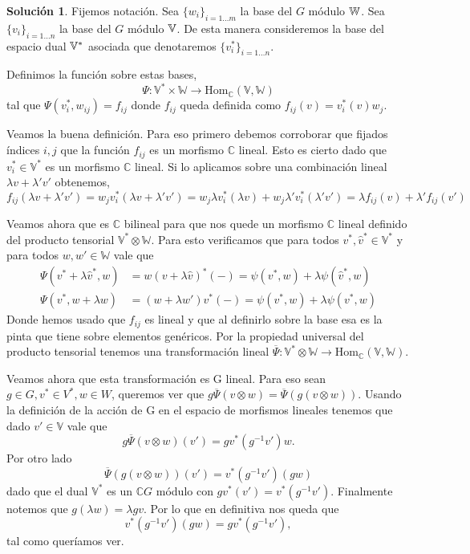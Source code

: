 \documentclass[11pt]{article}
\theoremstyle{plain}
\theoremstyle{definition}
\newtheorem*{sol}{Solución}
\theoremstyle{remark}
\newcommand\VV{\mathbb{V}}
\newcommand\WW{\mathbb{W}}
\newcommand\CC{\mathbb{C}}
\begin{document}
\begin{sol}
	Fijemos notación. Sea $\{w_i\}_{i=1 \dots m}$ la base del $G$ módulo $\Bbb W$. 
	Sea $\{v_i\}_{i=1 \dots n}$ la base del $G$ módulo $\Bbb V$. De esta manera consideremos la base del espacio dual $\Bbb V^*$ asociada que denotaremos $\{ v^*_i\}_{i=1 \dots n}$.
	
	Definimos la función sobre estas bases,
	\begin{equation*}
	\Psi: \VV^* \times \WW \to \text{Hom}_{\CC} (\VV, \WW) 
	\end{equation*}
	tal que $\Psi (v^*_i, w_{ij}) = f_{ij}$ donde $f_{ij}$ queda definida como $f_{ij} (v) = v^*_i(v) w_j$. 
	
	Veamos la buena definición. Para eso primero debemos corroborar que fijados índices $i,j$ que la función $f_{ij}$ es un morfismo $\CC$ lineal. Esto es cierto dado que $v^*_i \in \VV^{*}$ es un morfismo $\CC$ lineal. Si lo aplicamos sobre una combinación lineal $\lambda v + \lambda' v'$ obtenemos,
	\begin{equation*}
	f_{ij}(\lambda v + \lambda' v') = w_j v^*_i (\lambda v + \lambda' v') = w_j \lambda v^*_i(\lambda v) + w_j \lambda' v^*_i (\lambda' v') = \lambda f_{ij}(v) + \lambda' f_{ij}(v')
	\end{equation*}
	
	Veamos ahora que es $\CC$ bilineal para que nos quede un morfismo $\CC$ lineal definido del producto tensorial $\VV^* \otimes \WW$. 
	Para esto verificamos que para todos $v^*,\hat v^* \in \VV^*$ y para todos $w,w' \in \WW$ vale que
	\begin{align*}
	\Psi (v^* + \lambda \hat v ^*, w) &= w (v + \lambda \hat v)^*(-)   = \psi (v^*,w) +  \lambda\psi  ( \hat v ^*, w)  \\
	\Psi (v^*, w + \lambda w) &= (w+\lambda w') v^*(-) = \psi (v^*, w)  + \lambda \psi (v^*,  w)
	\end{align*}
	Donde hemos usado que $f_{ij}$ es lineal y que al definirlo sobre la base esa es la pinta que tiene sobre elementos genéricos. Por la propiedad universal del producto tensorial tenemos una transformación lineal $\overline \Psi: \VV^* \otimes \WW \to \text{Hom}_{\CC} (\VV, \WW)$.
	
	Veamos ahora que esta transformación es G lineal. Para eso sean $g \in G, v^* \in V^*, w \in W$, queremos ver que $g \overline \Psi (v \otimes w) = \overline \Psi (g (v \otimes w))$. Usando la definición de la acción de G en el espacio de morfismos lineales tenemos que dado $v' \in \VV$ vale que \[g \overline \Psi (v \otimes w)(v') = g v^*(g^{-1} v')w.\]
	Por otro lado 
	\begin{equation*}
	\overline \Psi (g (v \otimes w)) (v') = v^{*}(g^{-1}v')(gw)
	\end{equation*} 
	dado que el dual $\VV^*$ es un $\CC G$ módulo con $gv^{*}(v') = v^{*}(g^{-1}v')$. Finalmente notemos que $g(\lambda w) = \lambda gv$. Por lo que en definitiva nos queda que 
	\begin{equation*}
	v^{*}(g^{-1}v')(gw) = g v^{*}(g^{-1}v'),
	\end{equation*}
	tal como queríamos ver. 
	

\end{sol}
\end{document}
